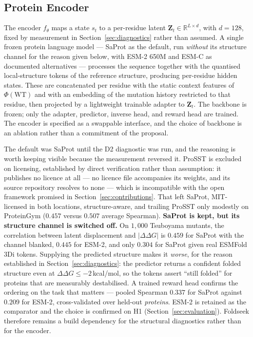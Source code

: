 \documentclass[12pt, a4paper]{article}
\begin{document}
\subsection{Protein Encoder}
\label{sec:encoder}

The encoder $f_\theta$ maps a state $s_t$ to a per-residue latent $\mathbf{Z}_t \in \mathbb{R}^{L \times d}$, with $d = 128$, fixed by measurement in Section~\ref{sec:diagnostics} rather than assumed. A single frozen protein language model --- SaProt \citep{su2024saprot} as the default, run \textit{without} its structure channel for the reason given below, with ESM-2 650M \citep{lin2023esm2} and ESM-C \citep{esmcambrian} as documented alternatives --- processes the sequence together with the quantised local-structure tokens of the reference structure, producing per-residue hidden states. These are concatenated per residue with the static context features of $\Phi(\mathrm{WT})$ and with an embedding of the mutation history restricted to that residue, then projected by a lightweight trainable adapter to $\mathbf{Z}_t$. The backbone is frozen; only the adapter, predictor, inverse head, and reward head are trained. The encoder is specified as a swappable interface, and the choice of backbone is an ablation rather than a commitment of the proposal.

The default was SaProt until the D2 diagnostic was run, and the reasoning is worth keeping visible because the measurement reversed it. ProSST is excluded on licensing, established by direct verification rather than assumption: it publishes no licence at all --- no licence file accompanies its weights, and its source repository resolves to none --- which is incompatible with the open framework promised in Section~\ref{sec:contributions}. That left SaProt, MIT-licensed in both locations, structure-aware, and trailing ProSST only modestly on ProteinGym ($0.457$ versus $0.507$ average Spearman). \textbf{SaProt is kept, but its structure channel is switched off.} On $1{,}000$ Tsuboyama mutants, the correlation between latent displacement and $\lvert\Delta\Delta G\rvert$ is $0.459$ for SaProt with the channel blanked, $0.445$ for ESM-2, and only $0.304$ for SaProt given real ESMFold $3$Di tokens. Supplying the predicted structure makes it \textit{worse}, for the reason established in Section~\ref{sec:diagnostics}: the predictor returns a confident folded structure even at $\Delta\Delta G \leq -2$\,kcal/mol, so the tokens assert ``still folded'' for proteins that are measurably destabilised. A trained reward head confirms the ordering on the task that matters --- pooled Spearman $0.337$ for SaProt against $0.209$ for ESM-2, cross-validated over held-out \textit{proteins}. ESM-2 is retained as the comparator and the choice is confirmed on H1 (Section~\ref{sec:evaluation}). Foldseek therefore remains a build dependency for the structural diagnostics rather than for the encoder.
\end{document}
